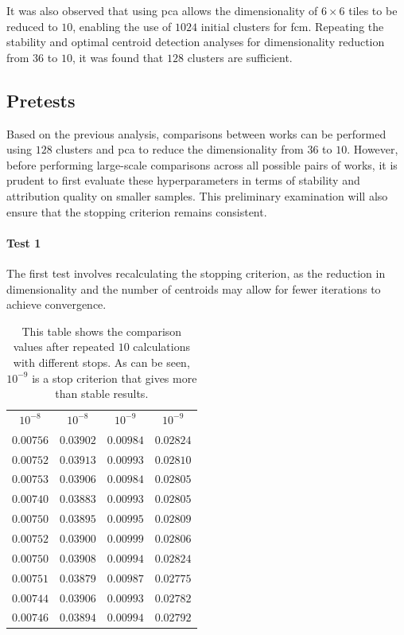 \begin{toReview}
	\noindent It was also observed that using \gls{pca} allows the dimensionality of $6\times6$ tiles to be reduced to $10$, enabling the use of $1024$ initial clusters for \gls{fcm}. Repeating the stability and optimal centroid detection analyses for dimensionality reduction from $36$ to $10$, it was found that $128$ clusters are sufficient.

	\subsection{Pretests}
	Based on the previous analysis, comparisons between works can be performed using $128$ clusters and \gls{pca} to reduce the dimensionality from $36$ to $10$. However, before performing large-scale comparisons across all possible pairs of works, it is prudent to first evaluate these hyperparameters in terms of stability and attribution quality on smaller samples. This preliminary examination will also ensure that the stopping criterion remains consistent.

	\paragraph{Test 1}
	The first test involves recalculating the stopping criterion, as the reduction in dimensionality and the number of centroids may allow for fewer iterations to achieve convergence.
	\newpage
	\begin{table}[H]
		\centering
		\begin{tabular}{|c|c|c|c|}
			\hline
			\rowcolor{ambra}
			\multicolumn{4}{|c|}{stop criteria} \\
			\hline
			\rowcolor{lavender}
			$10^{-8}$ & $10^{-8}$ & $10^{-9}$ & $10^{-9}$ \\
			\hline
			$0.00756$ & $0.03902$ & $0.00984$ & $0.02824$ \\
			\hline
			$0.00752$ & $0.03913$ & $0.00993$ & $0.02810$ \\
			\hline
			$0.00753$ & $0.03906$ & $0.00984$ & $0.02805$ \\
			\hline
			$0.00740$ & $0.03883$ & $0.00993$ & $0.02805$ \\
			\hline
			$0.00750$ & $0.03895$ & $0.00995$ & $0.02809$ \\
			\hline
			$0.00752$ & $0.03900$ & $0.00999$ & $0.02806$ \\
			\hline
			$0.00750$ & $0.03908$ & $0.00994$ & $0.02824$ \\
			\hline
			$0.00751$ & $0.03879$ & $0.00987$ & $0.02775$ \\
			\hline
			$0.00744$ & $0.03906$ & $0.00993$ & $0.02782$ \\
			\hline
			$0.00746$ & $0.03894$ & $0.00994$ & $0.02792$ \\
			\hline
		\end{tabular}
		\caption[Stability of comparison algorithm for $6\times6$ tiles]{This table shows the comparison values after repeated $10$ calculations with different stops. As can be seen, $10^{-9}$ is a stop criterion that gives more than stable results.}
		\label{tab:distStability_tuning}
	\end{table}


\end{toReview}
